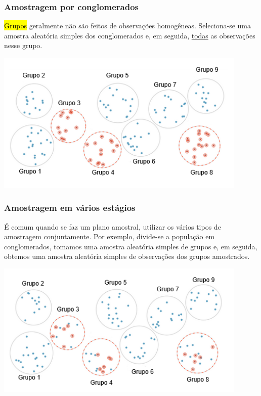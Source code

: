 
\begin{frame}
\frametitle{Amostragem por conglomerados}
\justifying
\hl{Grupos} geralmente não são feitos de observações homogêneas. Seleciona-se uma amostra aleatória simples dos conglomerados e, em seguida, \underline{todas} as observações nesse grupo. 

\begin{center}
\includegraphics[width=0.9\textwidth]{1-4_obs_studies_sampling/cluster.png}
\end{center}

\end{frame}


\begin{frame}
\frametitle{Amostragem em vários estágios}
\justifying
É comum quando se faz um plano amostral, utilizar os vários tipos de amostragem conjuntamente. Por exemplo, divide-se a população em conglomerados, tomamos uma amostra aleatória simples de grupos e, em seguida, obtemos uma amostra aleatória simples de observações dos grupos amostrados.

\begin{center}
\includegraphics[width=0.9\textwidth]{1-4_obs_studies_sampling/multistage.png}
\end{center}

\end{frame}

